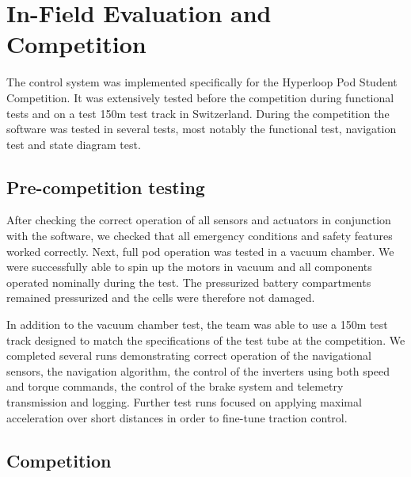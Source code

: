 \section{In-Field Evaluation and Competition}

The control system was implemented specifically for the Hyperloop Pod Student Competition. It was extensively tested before the competition during functional tests and on a test 150m test track in Switzerland. During the competition the software was tested in several tests, most notably the functional test, navigation test and state diagram test.

\subsection{Pre-competition testing}

After checking the correct operation of all sensors and actuators in conjunction with the software, we checked that all emergency conditions and safety features worked correctly. Next, full pod operation was tested in a vacuum chamber. We were successfully able to spin up the motors in vacuum and all components operated nominally during the test. The pressurized battery compartments remained pressurized and the cells were therefore not damaged.

In addition to the vacuum chamber test, the team was able to use a 150m test track designed to match the specifications of the test tube at the competition. We completed several runs demonstrating correct operation of the navigational sensors, the navigation algorithm, the control of the inverters using both speed and torque commands, the control of the brake system and telemetry transmission and logging. Further test runs focused on applying maximal acceleration over short distances in order to fine-tune traction control.

\subsection{Competition}

